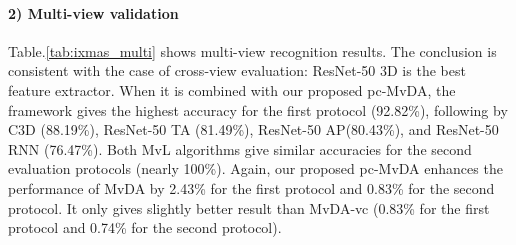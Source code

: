     \paragraph{2) Multi-view validation} Table.\ref{tab:ixmas_multi} shows multi-view recognition results. The conclusion is consistent with the case of cross-view evaluation: ResNet-50 3D is the best feature extractor. When it is combined with our proposed pc-MvDA, the framework gives the highest accuracy for the first protocol (92.82\%), following by C3D (88.19\%), ResNet-50 TA (81.49\%), ResNet-50 AP(80.43\%), and ResNet-50 RNN (76.47\%). Both MvL algorithms give similar accuracies for the second evaluation protocols (nearly 100\%). Again, our proposed pc-MvDA enhances the performance of MvDA by 2.43\% for the first protocol and 0.83\% for the second protocol. It only gives slightly better result than MvDA-vc (0.83\% for the first protocol and 0.74\% for the second protocol). 

    \begin{table}[htbp]
    \centering
    \caption{Multi-view recognition comparison on IXMAS dataset}
    \label{tab:ixmas_multi}
    \end{table}

